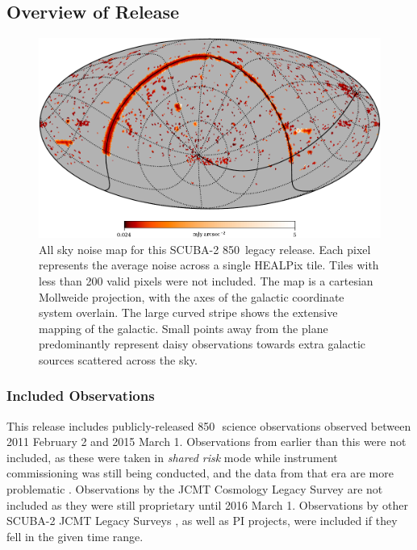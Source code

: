 \documentclass[twocolumn]{aastex6}
\newcommand{\um}{\micron}
\begin{document}
\subsection{Overview of Release}

\begin{figure}
  \centering
  \includegraphics{mollweide-average-noise-galacticaxes-crop}
  \caption{All sky noise map for this SCUBA-2 850\,\um{} legacy
    release. Each pixel represents the average noise across a single
    HEALPix tile. Tiles with less than 200 valid pixels were not
    included. The map is a cartesian Mollweide projection, with the
    axes of the galactic coordinate system overlain. The large curved
    stripe shows the extensive mapping of the galactic. Small points
    away from the plane predominantly represent daisy observations
    towards extra galactic sources scattered across the sky.}
  \label{fig:noise-aitoff}
\end{figure}

\subsubsection{Included Observations}
This release includes publicly-released 850\,\um\ science
observations observed between 2011 February 2 and 2015 March
1. Observations from earlier than this were not included, as these
were taken in \emph{shared risk} mode while instrument commissioning
was still being conducted, and the data from that era are more
problematic \citep{SC19,Dempsey2010}.  Observations by the JCMT
Cosmology Legacy Survey \citep{Geach2013} are not included as they were
still proprietary until 2016 March 1. Observations by other SCUBA-2
JCMT Legacy Surveys
\citep[e.g.,][]{ChrysostomouJLS,GBS,SASSy,SONS,JPS}, as well as PI
projects, were included if they fell in the given time
range.
\end{document}
